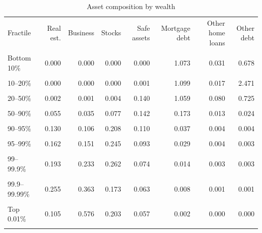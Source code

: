 \begin{table}[htbp]\centering\small
\caption{Asset composition by wealth}
\label{tab:portfolio_comp_core_fractiles_pooled}
\begin{tabular}{lrrrrrrr}\toprule
Fractile & Real est. & Business & Stocks & Safe assets & Mortgage debt & Other home loans & Other debt \\\\ \midrule
Bottom 10\% & 0.000 & 0.000 & 0.000 & 0.000 & 1.073 & 0.031 & 0.678 \\\\
10--20\% & 0.000 & 0.000 & 0.000 & 0.001 & 1.099 & 0.017 & 2.471 \\\\
20--50\% & 0.002 & 0.001 & 0.004 & 0.140 & 1.059 & 0.080 & 0.725 \\\\
50--90\% & 0.055 & 0.035 & 0.077 & 0.142 & 0.173 & 0.013 & 0.024 \\\\
90--95\% & 0.130 & 0.106 & 0.208 & 0.110 & 0.037 & 0.004 & 0.004 \\\\
95--99\% & 0.162 & 0.151 & 0.245 & 0.093 & 0.029 & 0.004 & 0.003 \\\\
99--99.9\% & 0.193 & 0.233 & 0.262 & 0.074 & 0.014 & 0.003 & 0.003 \\\\
99.9--99.99\% & 0.255 & 0.363 & 0.173 & 0.063 & 0.008 & 0.001 & 0.001 \\\\
Top 0.01\% & 0.105 & 0.576 & 0.203 & 0.057 & 0.002 & 0.000 & 0.000 \\\\
\bottomrule
\end{tabular}
\end{table}
